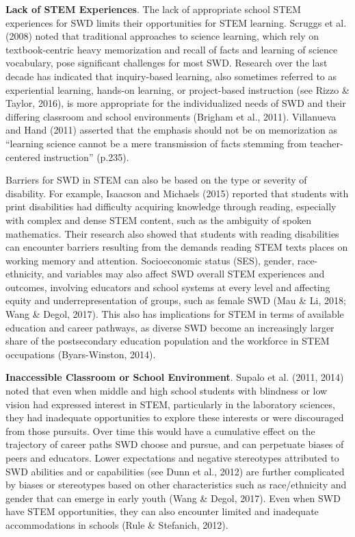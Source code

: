 \documentclass[11.5pt]{sig-alternate}
\begin{document}
\begin{large}
\textbf{Lack of STEM Experiences}. The lack of appropriate school STEM experiences for SWD limits their opportunities for STEM learning. Scruggs et al. (2008) noted that traditional approaches to science learning, which rely on textbook-centric heavy memorization and recall of facts and learning of science vocabulary, pose significant challenges for most SWD. Research over the last decade has indicated that inquiry-based learning, also sometimes referred to as experiential learning, hands-on learning, or project-based instruction (see Rizzo \& Taylor, 2016), is more appropriate for the individualized needs of SWD and their differing classroom and school environments (Brigham et al., 2011). Villanueva and Hand (2011) asserted that the emphasis should not be on memorization as “learning science cannot be a mere transmission of facts stemming from teacher-centered instruction” (p.235).      

Barriers for SWD in STEM can also be based on the type or severity of disability. For example, Isaacson and Michaels (2015) reported that students with print disabilities had difficulty acquiring knowledge through reading, especially with complex and dense STEM content, such as the ambiguity of spoken mathematics. Their research also showed that students with reading disabilities can encounter barriers resulting from the demands reading STEM texts places on working memory and attention. Socioeconomic status (SES), gender, race-ethnicity, and variables may also affect SWD overall STEM experiences and outcomes, involving educators and school systems at every level and affecting equity and underrepresentation of groups, such as female SWD (Mau \& Li, 2018; Wang \& Degol, 2017). This also has implications for STEM in terms of available education and career pathways, as diverse SWD become an increasingly larger share of the postsecondary education population and the workforce in STEM occupations (Byars-Winston, 2014).  

\textbf{Inaccessible Classroom or School Environment}. Supalo et al. (2011, 2014) noted that even when middle and high school students with blindness or low vision had expressed interest in STEM, particularly in the laboratory sciences, they had inadequate opportunities to explore these interests or were discouraged from those pursuits. Over time this would have a cumulative effect on the trajectory of career paths SWD choose and pursue, and can perpetuate biases of peers and educators. Lower expectations and negative stereotypes attributed to SWD abilities and or capabilities (see Dunn et al., 2012) are further complicated by biases or stereotypes based on other characteristics such as race/ethnicity and gender that can emerge in early youth (Wang \& Degol, 2017). Even when SWD have STEM opportunities, they can also encounter limited and inadequate accommodations in schools (Rule \& Stefanich, 2012).


\end{large}
\end{document}

